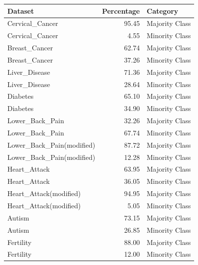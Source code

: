 \begin{table}[H]
\centering
\begin{tabular}{lrl}
  \hline
Dataset & Percentage & Category \\ 
  \hline
Cervical\_Cancer & 95.45 & Majority Class \\ 
  Cervical\_Cancer & 4.55 & Minority Class \\ 
  Breast\_Cancer & 62.74 & Majority Class \\ 
  Breast\_Cancer & 37.26 & Minority Class \\ 
  Liver\_Disease & 71.36 & Majority Class \\ 
  Liver\_Disease & 28.64 & Minority Class \\ 
  Diabetes & 65.10 & Majority Class \\ 
  Diabetes & 34.90 & Minority Class \\ 
  Lower\_Back\_Pain & 32.26 & Majority Class \\ 
  Lower\_Back\_Pain & 67.74 & Minority Class \\ 
  Lower\_Back\_Pain(modified) & 87.72 & Majority Class \\ 
  Lower\_Back\_Pain(modified) & 12.28 & Minority Class \\ 
  Heart\_Attack & 63.95 & Majority Class \\ 
  Heart\_Attack & 36.05 & Minority Class \\ 
  Heart\_Attack(modified) & 94.95 & Majority Class \\ 
  Heart\_Attack(modified) & 5.05 & Minority Class \\ 
  Autism & 73.15 & Majority Class \\ 
  Autism & 26.85 & Minority Class \\ 
  Fertility & 88.00 & Majority Class \\ 
  Fertility & 12.00 & Minority Class \\ 
   \hline
\end{tabular}
\end{table}

